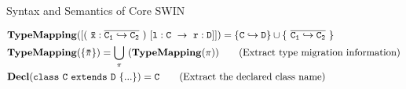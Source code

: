 \begin{section}{Syntax and Semantics of Core SWIN}
\begin{figure*}[htb!]
\begin{center}
\noLine
{}
\DP
\end{center}
\vspace{2pt}

\begin{center}
\DP
\end{center}
\vspace{2pt}

\begin{center}
\DP
\end{center}
\vspace{2pt}

\begin{center}
                 
\DP
\end{center}
\vspace{2pt}
\caption{Evaluation Rules of SWIN}
\label{semanticsofuc}
\end{figure*}

\begin{figure*}
\begin{align*}  
&\tt \mathbf{TypeMapping}([(~\bar{x}:\overline{C_1\hookrightarrow C_2}~)\ [l:C\ \rightarrow\ r:D]]) = \{C\hookrightarrow D\}\cup\{~\overline{C_1\hookrightarrow C_2}~\}\\
&\tt \mathbf{TypeMapping}(\{\bar{\pi}\}) = \bigcup_{\pi}~(\mathbf{TypeMapping}(\pi)) ~~~~~~ \text{(Extract type migration information)}\\
&\tt \mathbf{Decl}(class~C~extends~D~\{...\}) = C   ~~~~~~
\text{(Extract the declared class name)}
\end{align*}
\caption{Auxiliary Functions used in Figure~\ref{semanticsofuc} and Figure~\ref{logicrules}}
\label{auxiliarydefofuc}
\end{figure*}


\end{section}

